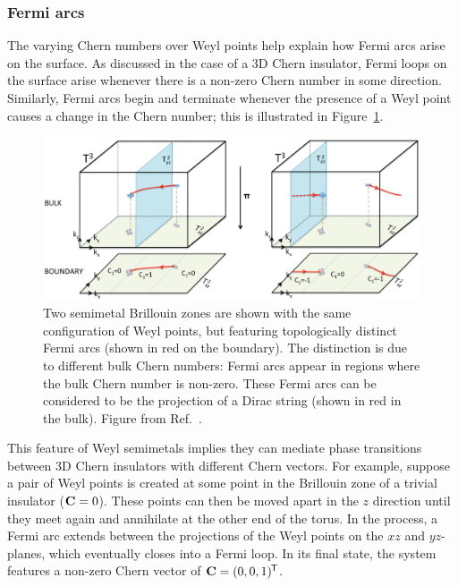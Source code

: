 \subsubsection{Fermi arcs}

The varying Chern numbers over Weyl points help explain how Fermi arcs arise on the surface. As discussed in the case of a 3D Chern insulator, Fermi loops on the surface arise whenever there is a non-zero Chern number in some direction. Similarly, Fermi arcs begin and terminate whenever the presence of a Weyl point causes a change in the Chern number; this is illustrated in Figure~\ref{fig:Fermi-arc-Chern}.
\begin{figure}[htb!]
	\centering
	\includegraphics[width=\linewidth]{Images/Fermi-arc-Chern}
	\caption{
		Two semimetal Brillouin zones are shown with the same configuration of Weyl points, but featuring topologically distinct Fermi arcs (shown in red on the boundary). The distinction is due to different bulk Chern numbers: Fermi arcs appear in regions where the bulk Chern number is non-zero. These Fermi arcs can be considered to be the projection of a Dirac string (shown in red in the bulk).
		Figure from Ref.~\cite{Mathai_math-review}.}
	\label{fig:Fermi-arc-Chern}
\end{figure}

This feature of Weyl semimetals implies they can mediate phase transitions between 3D Chern insulators with different Chern vectors. For example, suppose a pair of Weyl points is created at some point in the Brillouin zone of a trivial insulator ($\vb{C}=0$). These points can then be moved apart in the $z$ direction until they meet again and annihilate at the other end of the torus. In the process, a Fermi arc extends between the projections of the Weyl points on the $xz$ and $yz$-planes, which eventually closes into a Fermi loop. In its final state, the system features a non-zero Chern vector of $\vb{C} = (0,0,1)^{\mkern-1.5mu\mathsf{T}}$.

